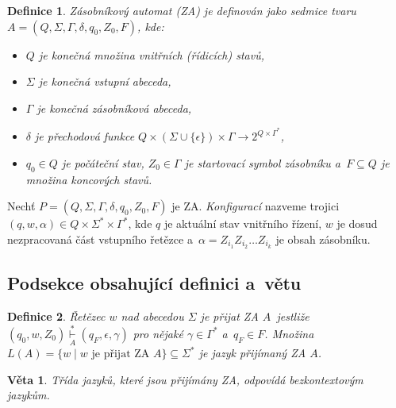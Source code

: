\documentclass[11pt, twocolumn, a4paper]{article}
\begin{document}
\newtheorem{definition}{Definice}
\begin{definition}
	\label{def_1}
	\emph{Zásobníkový automat} (ZA) je definován jako sedmice tvaru $A = (Q, \Sigma, 
	\Gamma, \delta, q_0, Z_0, F)$, kde:
	\begin{itemize}
		\item $Q$ je konečná množina \emph{vnitřních (řídicích) stavů},
		\item $\Sigma$ je konečná \emph{vstupní abeceda},
		\item $\Gamma$ je konečná \emph{zásobníková abeceda},
		\item $\delta$ je \emph{přechodová funkce} $Q \times (\Sigma \cup \{
		      \epsilon \}) \times \Gamma \to 2^{Q \times \Gamma^*}$,
		\item $q_0 \in Q$ je \emph{počáteční stav}, $Z_0 \in \Gamma$ je 
		      \emph{startovací symbol zásobníku} a~$F \subseteq Q$ je množina \emph{koncových stavů}.
	\end{itemize}
\end{definition}
Nechť $P = (Q, \Sigma, \Gamma, \delta, q_0, Z_0, F)$ je ZA. \emph{Konfigurací} nazveme
trojici $(q, w, \alpha) \in Q \times \Sigma^* \times \Gamma^*$, kde $q$ je aktuální stav
vnitřního řízení, $w$ je dosud nezpracovaná část vstupního řetězce a~$\alpha = Z_{i_1} Z_{i_2} \dots Z_{i_k}$ je obsah zásobníku.

\subsection{Podsekce obsahující definici a~větu}
\begin{definition}
	\label{def_2}
	\emph{Řetězec $w$ nad abecedou $\Sigma$ je přijat ZA $A$}~jestliže $(q_0, w, Z_0) \overset{*}{\underset{A}{\vdash}} (q_F, \epsilon, \gamma)$
	pro nějaké $\gamma \in \Gamma^*$ a~$q_F \in F$. Množina $L(A) = \{w \mid w \text{ je přijat ZA }A\} \subseteq \Sigma^*$ je \emph{jazyk přijímaný ZA} $A$.
\end{definition}

\newtheorem{theorem}{Věta}
\begin{theorem}
	\label{thm_1}
	Třída jazyků, které jsou přijímány ZA, odpovídá \emph{bezkontextovým jazykům}.
\end{theorem}
\end{document}
